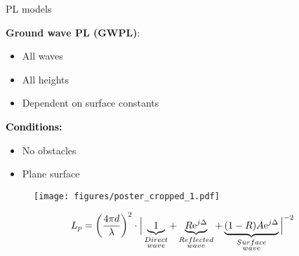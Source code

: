 \documentclass[10pt]{beamer}
\begin{document}
\begin{frame}{PL models}
\begin{minipage}{.45\textwidth}
\raggedright\textcolor{thomaspurple}{\textbf{Ground wave PL (GWPL)}:}
\begin{itemize}
\item All waves
\item All heights
\item Dependent on surface constants
\end{itemize} 

\vspace{1em}
\textcolor{black}{\textbf{Conditions:}}
\begin{itemize}
\item No obstacles
\item Plane surface
\end{itemize}

\end{minipage}
\begin{minipage}{0.5\textwidth}
\begin{figure}[!htbp]
 \centering
  \texttt{[image: figures/poster\_cropped\_1.pdf]}
  \end{figure}
\end{minipage}

\vspace{1em}
\begin{equation}
L_p=\left(\frac{4 \pi d}{\lambda}\right)^2 \cdot \Big|\underbrace{1}_{\begin{subarray}{c}Direct\\wave\end{subarray}}+\underbrace{R\text{e}^{j\Delta}}_{\begin{subarray}{c}Reflected\\wave\end{subarray}}+\underbrace{(1-R)A\text{e}^{j\Delta}}_{\begin{subarray}{c}Surface\\wave\end{subarray}}\Big|^{-2} 
\label{ground_wave}
\end{equation}
\end{frame}

\end{document}

